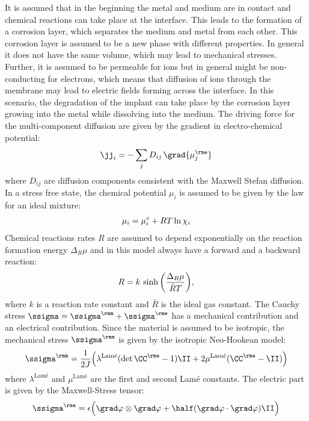 It is assumed that in the beginning the metal and medium are in contact and chemical reactions can take place at the interface. This leads to the formation of a corrosion layer, which separates the medium and metal from each other. This corrosion layer is assumed to be a new phase with different properties. In general it does not have the same volume, which may lead to mechanical stresses. Further, it is assumed to be permeable for ions but in general might be non-conducting for electrons, which means that diffusion of ions through the membrane may lead to electric fields forming across the interface. In this scenario, the degradation of the implant can take place by the corrosion layer growing into the metal while dissolving into the medium. The driving force for the multi-component diffusion are given by the gradient in electro-chemical potential:
\begin{align}
  \jj_i = -\sum_j D_{ij} \, \grad{\mu_j^\rme}
\end{align}
where $D_{ij}$ are diffusion components consistent with the Maxwell Stefan diffusion. In a stress free state, the chemical potential $\mu_i$ is assumed to be given by the law for an ideal mixture: 
\begin{align}
  \mu_i = \mu_{i}^{\circ} + RT \ln{\chi_i}
\end{align}
Chemical reactions rates $R$ are assumed to depend exponentially on the reaction formation energy $\Delta_R\mu$ and in this model always have a forward and a backward reaction:
\begin{align}
  R = k\,\sinh\bigg(\frac{\Delta_R \mu}{\bar{R}T}\bigg),
\end{align}
where $k$ is a reaction rate constant and $\bar R$ is the ideal gas constant. The Cauchy stress $\ssigma=\ssigma^\rmm+\ssigma^\rme$ has a mechanical contribution and an electrical contribution. Since the material is assumed to be isotropic, the mechanical stress $\ssigma^\rmm$ is given by the isotropic Neo-Hookean model: 
\begin{align}
  \ssigma^\rmm = \frac{1}{2J} \Big( \lambda^{\text{Lam\'e}}(\det\CCe-1)\II+2\mu^{\text{Lam\'e}}(\CCe-\II)\Big)
\end{align}
where $\lambda^{\text{Lam\'e}}$ and $\mu^{\text{Lam\'e}}$ are the first and second Lam\'e constants.
The electric part is given by the Maxwell-Stress tensor:
\begin{align}
  \ssigma^\rme = \epsilon \Big(\grad\varphi \otimes \grad\varphi + \half (\grad\varphi \cdot \grad\varphi) \II \Big)
\end{align}
